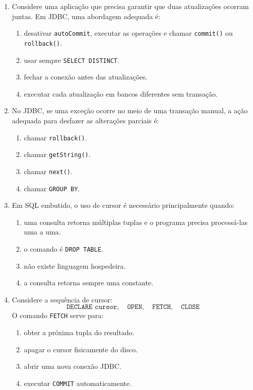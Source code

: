 \documentclass[12pt,a4paper]{article}
\begin{document}
\begin{enumerate}[resume,label=\textbf{Q\arabic*.}]
\item Considere uma aplicação que precisa garantir que duas atualizações ocorram juntas. Em JDBC, uma abordagem adequada é:

\begin{enumerate}[label=\alph*)]
    \item desativar \texttt{autoCommit}, executar as operações e chamar \texttt{commit()} ou \texttt{rollback()}.
    \item usar sempre \texttt{SELECT DISTINCT}.
    \item fechar a conexão antes das atualizações.
    \item executar cada atualização em bancos diferentes sem transação.
\end{enumerate}

\item No JDBC, se uma exceção ocorre no meio de uma transação manual, a ação adequada para desfazer as alterações parciais é:

\begin{enumerate}[label=\alph*)]
    \item chamar \texttt{rollback()}.
    \item chamar \texttt{getString()}.
    \item chamar \texttt{next()}.
    \item chamar \texttt{GROUP BY}.
\end{enumerate}

\item Em SQL embutido, o uso de cursor é necessário principalmente quando:

\begin{enumerate}[label=\alph*)]
    \item uma consulta retorna múltiplas tuplas e o programa precisa processá-las uma a uma.
    \item o comando é \texttt{DROP TABLE}.
    \item não existe linguagem hospedeira.
    \item a consulta retorna sempre uma constante.
\end{enumerate}

\item Considere a sequência de cursor:
\[
\texttt{DECLARE cursor},\quad \texttt{OPEN},\quad \texttt{FETCH},\quad \texttt{CLOSE}
\]
O comando \texttt{FETCH} serve para:

\begin{enumerate}[label=\alph*)]
    \item obter a próxima tupla do resultado.
    \item apagar o cursor fisicamente do disco.
    \item abrir uma nova conexão JDBC.
    \item executar \texttt{COMMIT} automaticamente.
\end{enumerate}


\end{enumerate}
\end{document}
